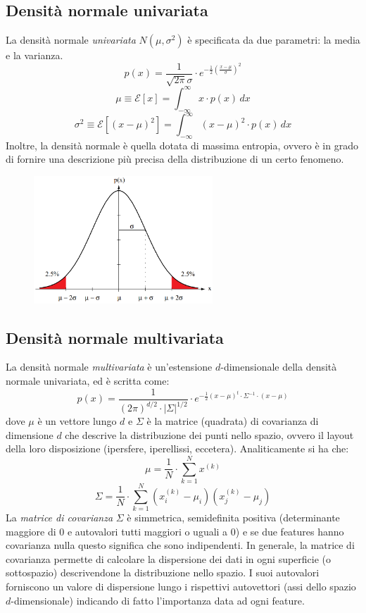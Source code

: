 \documentclass[a4paper,oneside,titlepage]{book}
\begin{document}
\subsection{Densità normale univariata}
La densità normale \textit{univariata} $N(\mu, \sigma^2)$ è specificata da due parametri: la media e la varianza.
\[ p(x) = \frac{1}{\sqrt{2 \pi} \sigma} \cdot e^{- \frac{1}{2} \left( \frac{x - \mu}{\sigma} \right)^2} \]
\[ \mu \equiv \mathcal{E}[x] = \int_{- \infty}^{\infty} x \cdot p(x) \, dx \]
\[ \sigma^2 \equiv \mathcal{E}[(x - \mu)^2] = \int_{- \infty}^{\infty} (x - \mu)^2 \cdot p(x) \, dx \]
Inoltre, la densità normale è quella dotata di massima entropia, ovvero è in grado di fornire una descrizione più precisa della distribuzione di un certo fenomeno.
\begin{figure}[htp]
	\centering
	\includegraphics[width=0.6\textwidth]{univariata.png}
\end{figure}

\subsection{Densità normale multivariata}
La densità normale \textit{multivariata} è un'estensione $d$-dimensionale della densità normale univariata, ed è scritta come:
\[ p(x) = \frac{1}{(2 \pi)^{d/2} \cdot |\Sigma|^{1/2}} \cdot e^{- \frac{1}{2} (x - \mu)^t \cdot \Sigma^{-1} \cdot (x - \mu)} \]
dove $\mu$ è un vettore lungo $d$ e $\Sigma$ è la matrice (quadrata) di covarianza di dimensione $d$ che descrive la distribuzione dei punti nello spazio, ovvero il layout della loro disposizione (ipersfere, iperellissi, eccetera). Analiticamente si ha che:
\[ \mu = \frac{1}{N} \cdot \sum_{k=1}^N x^{(k)} \]
\[ \Sigma = \frac{1}{N} \cdot \sum_{k=1}^N (x_i^{(k)} - \mu_i)(x_j^{(k)} - \mu_j) \]
La \textit{matrice di covarianza} $\Sigma$ è simmetrica, semidefinita positiva (determinante maggiore di 0 e autovalori tutti maggiori o uguali a 0) e se due features hanno covarianza nulla questo significa che sono indipendenti. In generale, la matrice di covarianza permette di calcolare la dispersione dei dati in ogni superficie (o sottospazio) descrivendone la distribuzione nello spazio. I suoi autovalori forniscono un valore di dispersione lungo i rispettivi autovettori (assi dello spazio $d$-dimensionale) indicando di fatto l'importanza data ad ogni feature.
\end{document}

